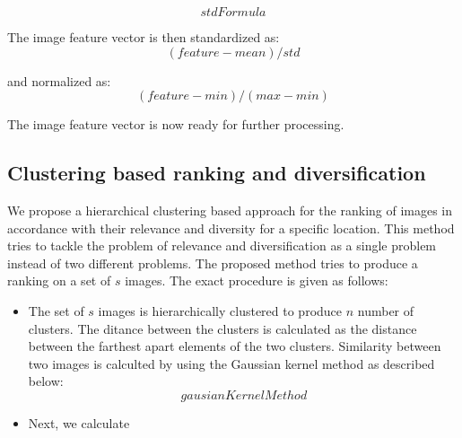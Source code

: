 \documentclass{acm_proc_article-me11_tweaked}
\begin{document}
\begin{equation}
 stdFormula
\end{equation}

The image feature vector is then standardized as:
\begin{equation}
 (feature-mean)/std
\end{equation}

and normalized as:
\begin{equation}
 (feature-min)/(max-min)
\end{equation}

The image feature vector is now ready for further processing.
\subsection{Clustering based ranking and diversification}
We propose a hierarchical clustering based approach for the ranking of images in accordance with their relevance and diversity for a specific location. 
This method tries to tackle the problem of relevance and diversification as a single problem instead of two different problems. 
The proposed method tries to produce a ranking on a set of $s$ images. The exact procedure is given as follows:
\begin{itemize}
 \item The set of $s$ images is hierarchically clustered to produce $n$ number of clusters. The ditance between the clusters is calculated as the distance between the farthest apart elements of the two clusters.
 Similarity between two images is calculted by using the Gaussian kernel method as described below:
 \begin{equation}\label{gaussian-similarity}
  gausianKernelMethod
 \end{equation}
 \item Next, we calculate

\end{itemize}


\end{document}

